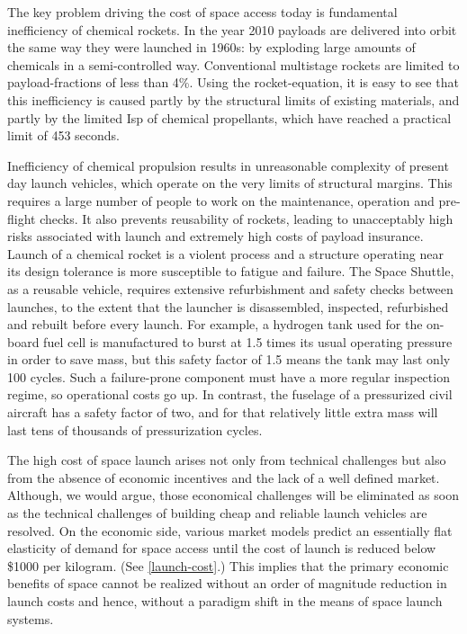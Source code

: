 \documentclass[letter,11pt]{article}
\begin{document}
The key problem driving the cost of space access today is fundamental
inefficiency of chemical rockets. In the year 2010 payloads are delivered into
orbit the same way they were launched in 1960s: by exploding large amounts of
chemicals in a semi-controlled way. Conventional multistage rockets are limited
to \glspl{payload-fraction} of less than 4\%. Using the \gls{rocket-equation},
it is easy to see that this inefficiency is caused partly by the structural
limits of existing materials, and partly by the limited \gls{Isp} of chemical
propellants, which have reached a practical limit of 453 seconds. 
 
Inefficiency of chemical propulsion results in unreasonable complexity of
present day launch vehicles, which operate on the very limits of structural
margins. This requires a large number of people to work on the maintenance,
operation and pre-flight checks.  It also prevents reusability of rockets,
leading to unacceptably high risks associated with launch and extremely high
costs of payload insurance. Launch of a chemical rocket is a violent process
and a structure operating near its design tolerance is more susceptible to
fatigue and failure. The Space Shuttle, as a reusable vehicle, requires
extensive refurbishment and safety checks between launches, to the extent that
the launcher is disassembled, inspected, refurbished and rebuilt before every
launch. For example, a hydrogen tank used for the on-board fuel cell is
manufactured to burst at 1.5 times its usual operating pressure in order to
save mass, but this safety factor of 1.5 means the tank may last only 100
cycles. Such a failure-prone component must have a more regular inspection
regime, so operational costs go up. In contrast, the fuselage of a pressurized
civil aircraft has a safety factor of two, and for that relatively little extra
mass will last tens of thousands of pressurization cycles. 
 
The high cost of space launch arises not only from technical challenges but
also from the absence of economic incentives and the lack of a well defined
market.  Although, we would argue, those economical challenges will be
eliminated as soon as the technical challenges of building cheap and reliable
launch vehicles are resolved. On the economic side, various market models
predict an essentially flat elasticity of demand for space access until the
cost of launch is reduced below \$1000 per kilogram\cite{CommSpace1997}. (See
\autoref{launch-cost}.) This implies that the primary economic benefits of space
cannot be realized without an order of magnitude reduction in launch costs and
hence, without a paradigm shift in the means of space launch systems. 
 
\end{document}
